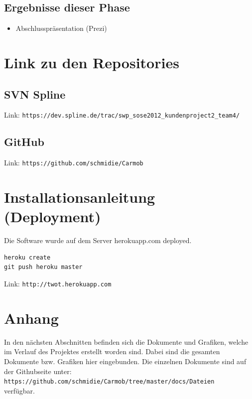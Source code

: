\documentclass[12pt,a4paper]{article}
\begin{document}
\subsection{Ergebnisse dieser Phase}

\begin{itemize}
\item Abschlusspr\"asentation (Prezi)
\end{itemize}

\section{Link zu den Repositories}

\subsection{SVN Spline}

Link: \texttt{https://dev.spline.de/trac/swp\_sose2012\_kundenproject2\_team4/}

\subsection{GitHub}

Link: \texttt{https://github.com/schmidie/Carmob}

\section{Installationsanleitung (Deployment)}

Die Software wurde auf dem Server herokuapp.com deployed.

\begin{verbatim}
heroku create
git push heroku master
\end{verbatim}

Link: \texttt{http://twot.herokuapp.com}

\newpage




\section{Anhang}

In den n\"achsten Abschnitten befinden sich die Dokumente und Grafiken, welche im Verlauf des Projektes erstellt worden sind. Dabei sind die gesamten Dokumente bzw. Grafiken hier eingebunden. Die einzelnen Dokumente sind auf der Githubseite unter: \\ \texttt{https://github.com/schmidie/Carmob/tree/master/docs/Dateien} \\ verf\"ugbar.
\end{document}
